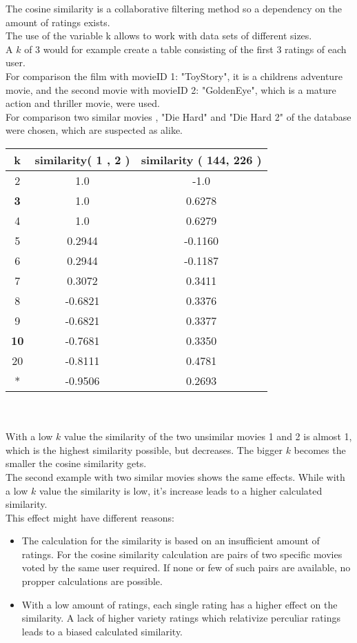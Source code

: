 \documentclass[a4paper,12pt,twoside]{article}
\begin{document}
The cosine similarity is a collaborative filtering method so a dependency on the amount of ratings exists. \\
The use of the variable k allows to work with data sets of different sizes. \\
A $k$ of 3 would for example create a table consisting of the first 3 ratings of each user. \\
For comparison the film with movieID 1: "ToyStory", it is a childrens adventure movie, and the second movie with movieID 2: "GoldenEye", which is a mature action and thriller movie, were used.\\
For comparison two similar movies , "Die Hard" and "Die Hard 2" of the database were chosen, which are suspected as alike.

\begin{tabular}{c|cc}
\textbf{k} & \textbf{similarity( 1 , 2 )} & \textbf{similarity ( 144, 226  )} \\ \hline
	2 & 1.0 & -1.0 \\
	\textbf{3} & 1.0 & 0.6278 \\
	4 & 1.0 & 0.6279 \\
	5 & 0.2944 & -0.1160 \\
	6 & 0.2944 & -0.1187\\
	7 & 0.3072 & 0.3411\\
	8 & -0.6821 &  0.3376 \\
	9 & -0.6821 & 0.3377\\
	\textbf{10} & -0.7681 & 0.3350\\
	20 & -0.8111 & 0.4781 \\
	* & -0.9506 & 0.2693 \\
\end{tabular} \\
\\
With a low $k$ value the similarity of the two unsimilar movies 1 and 2 is almost 1, which is the highest similarity possible, but decreases. The bigger $k$ becomes the smaller the cosine similarity gets.\\
The second example with two similar movies shows the same effects. While with a low $k$ value the similarity is low, it's increase leads to a higher calculated similarity.\\
This effect might have different reasons:\\
\begin{itemize}
\item The calculation for the similarity is based on an insufficient amount of ratings. For the cosine similarity calculation are pairs of two specific movies voted by the same user required. If none or few of such pairs are available, no propper calculations are possible.\\
\item With a low amount of ratings, each single rating has a higher effect on the similarity. A lack of higher variety ratings which relativize perculiar ratings leads to a biased calculated similarity.
\end{itemize}
\end{document}

